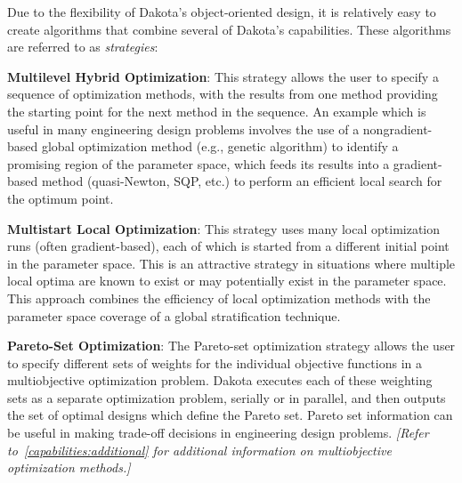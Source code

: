 Due to the flexibility of Dakota's object-oriented design, it is
relatively easy to create algorithms that combine several of Dakota's
capabilities. These algorithms are referred to as \emph{strategies}:

\textbf{Multilevel Hybrid Optimization}: This strategy allows the user to
specify a sequence of optimization methods, with the results from one
method providing the starting point for the next method in the
sequence. An example which is useful in many engineering design
problems involves the use of a nongradient-based global optimization
method (e.g., genetic algorithm) to identify a promising region of the
parameter space, which feeds its results into a gradient-based method
(quasi-Newton, SQP, etc.) to perform an efficient local search for the
optimum point.

\textbf{Multistart Local Optimization}: This strategy uses many local
optimization runs (often gradient-based), each of which is started
from a different initial point in the parameter space. This is an
attractive strategy in situations where multiple local optima are
known to exist or may potentially exist in the parameter space. This
approach combines the efficiency of local optimization methods with
the parameter space coverage of a global stratification technique.

\textbf{Pareto-Set Optimization}: The Pareto-set optimization strategy
allows the user to specify different sets of weights for the
individual objective functions in a multiobjective optimization
problem. Dakota executes each of these weighting sets as a separate
optimization problem, serially or in parallel, and then outputs the
set of optimal designs which define the Pareto set. Pareto set
information can be useful in making trade-off decisions in engineering
design problems.  \emph{[Refer to~\ref{capabilities:additional} for
additional information on multiobjective optimization methods.]}


